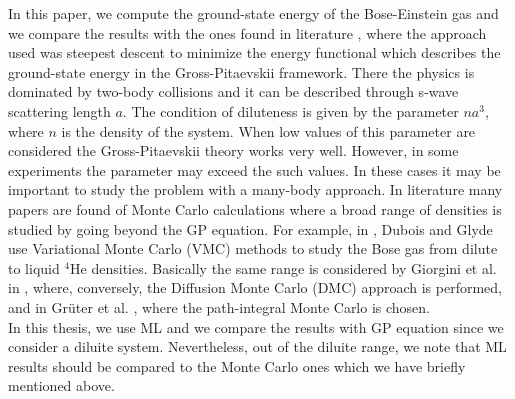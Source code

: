 In this paper, we compute the ground-state energy of the Bose-Einstein gas and we compare the results with the ones found in literature \cite{DalfString}, where the approach used was steepest descent to minimize the energy functional which describes the ground-state energy in the Gross-Pitaevskii framework. There the physics is dominated by two-body collisions and it can be described through s-wave scattering length $a$. The condition of diluteness is given by the parameter $na^3$, where $n$ is the density of the system. When low values of this parameter are considered the Gross-Pitaevskii theory works very well. However, in some experiments the parameter may exceed the such values. In these cases it may be important to study the problem with a many-body approach. In literature many papers are found of Monte Carlo calculations where a broad range of densities is studied by going beyond the GP equation. For example, in \cite{vmcarticle}, Dubois and Glyde use Variational Monte Carlo (VMC) methods to study the Bose gas from dilute to liquid $^4$He densities. Basically the same range is considered by Giorgini et al. in \cite{Giorgini}, where, conversely, the Diffusion Monte Carlo (DMC) approach is performed, and in Gr\"{u}ter et al. \cite{Gruter}, where the path-integral Monte Carlo is chosen. \\
In this thesis, we use ML and we compare the results with GP equation since we consider a diluite system. Nevertheless, out of the diluite range, we note that ML results should be compared to the Monte Carlo ones which we have briefly mentioned above. 





 

